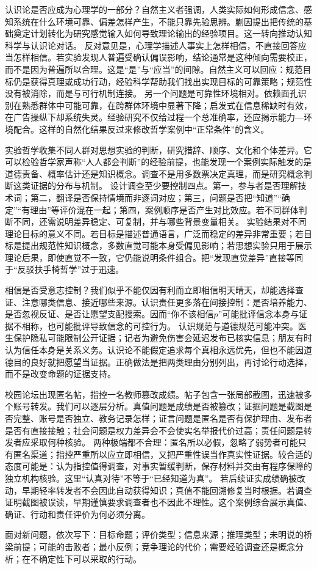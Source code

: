 认识论是否应成为心理学的一部分？自然主义者强调，人类实际如何形成信念、感知系统在什么环境可靠、偏差怎样产生，不能只靠先验思辨。蒯因提出把传统的基础奠定计划转化为研究感觉输入如何导致理论输出的经验项目\parencite{quine1969}。这一转向推动认知科学与认识论对话。 反对意见是，心理学描述人事实上怎样相信，不直接回答应当怎样相信。若实验发现人普遍受确认偏误影响，结论通常是这种倾向需要校正，而不是因为普遍所以合理。这是“是”与“应当”的间隙。自然主义可以回应：规范目标仍是获得真理或成功行动，经验科学帮助我们找出实现目标的可靠策略；规范性没有被消除，而是与可行机制连接。 另一个问题是可靠性环境相对。依赖面孔识别在熟悉群体中可能可靠，在跨群体环境中显著下降；启发式在信息稀缺时有效，在广告操纵下却系统失灵。经验研究不仅给过程一个总准确率，还应揭示能力—环境配合。这样的自然化结果反过来修改哲学案例中“正常条件”的含义。

实验哲学收集不同人群对思想实验的判断，研究措辞、顺序、文化和个体差异。它可以检验哲学家声称“人人都会判断”的经验前提，也能发现一个案例实际触发的是道德责备、概率估计还是知识概念。调查不是用多数票决定真理，而是研究概念判断这类证据的分布与机制。 设计调查至少要控制四点。第一，参与者是否理解技术词；第二，翻译是否保持情境而非逐词对应；第三，问题是否把“知道”“确定”“有理由”等评价混在一起；第四，案例顺序是否产生对比效应。若不同群体判断不同，还需说明差异稳定、可复制，并与哪些背景变量相关。 实验结果对不同理论目标的意义不同。若目标是描述普通语言，广泛而稳定的差异非常重要；若目标是提出规范性知识概念，多数直觉可能本身受偏见影响；若思想实验只用于展示理论后果，即使直觉不一致，它仍能说明条件组合。把“发现直觉差异”直接等同于“反驳扶手椅哲学”过于迅速。

相信是否受意志控制？我们似乎不能仅因有利而立即相信明天晴天，却能选择查证、注意哪类信息、接近哪些来源。认识责任更多落在间接控制：是否培养能力、是否忽视反证、是否让愿望支配搜索。因而“你不该相信$p$”可能批评信念本身与证据不相称，也可能批评导致信念的可控行为。 认识规范与道德规范可能冲突。医生保护隐私可能限制公开证据；记者为避免伤害会延迟发布已核实信息；朋友有时认为信任本身是关系义务。认识论不能假定追求每个真相永远优先，但也不能因道德目的良好就把愿望当证据。正确做法是把两类理由分别列出，再讨论行动选择，而不是改变命题的证据支持。

校园论坛出现匿名帖，指控一名教师篡改成绩。帖子包含一张局部截图，迅速被多个账号转发。我们可以逐层分析。真值问题是成绩是否被篡改；证据问题是截图是否完整、账号是否独立、教务记录怎样；证言问题是匿名是否有保护理由、发布者是否有直接接触；社会问题是权力差异会不会使实名举报代价过高；责任问题是转发者应采取何种核验。 两种极端都不合理：匿名所以必假，忽略了弱势者可能只有匿名渠道；指控严重所以应立即相信，又把严重性误当作真实性证据。较合适的态度可能是：认为指控值得调查，对事实暂缓判断，保存材料并交由有程序保障的独立机构核验。这里“认真对待”不等于“已经知道为真”。 若后续证实成绩确被改动，早期轻率转发者不会因此自动获得知识；真值不能回溯修复当时根据。若调查证明截图被误读，早期谨慎要求调查者也不因此不理性。这个案例综合展示真值、确证、行动和责任评价为何必须分离。

\begin{tcolorbox}[breakable,colback=white,colframe=blue!30!black,title={方法清单},fonttitle=\bfseries]
面对新问题，依次写下：目标命题；评价类型；信息来源；推理类型；未明说的桥梁前提；可能的击败者；最小反例；竞争理论的代价；需要经验调查还是概念分析；在不确定性下可以采取的行动。
\end{tcolorbox}
